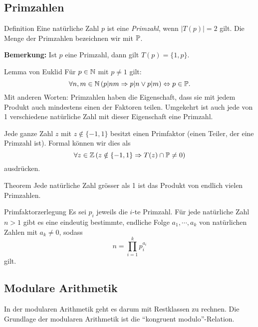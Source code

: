 \subsection{Primzahlen}\label{subsec:primzahlen}

\begin{definition}{Definition}
    Eine natürliche Zahl $p$ ist eine \emph{Primzahl}, wenn $|T(p)| = 2$ gilt.
    Die Menge der Primzahlen bezeichnen wir mit $\P$.
\end{definition}

\textbf{Bemerkung:} Ist $p$ eine Primzahl, dann gilt $T(p) = \{ 1,p \}$.

\begin{definition}{Lemma von Euklid}
    Für $p \in \N$ mit $p \neq 1$ gilt: \[\forall n,m \in \N \left( p|nm \Rightarrow p|n \lor p|m \right) \Leftrightarrow p \in \P.\]
    Mit anderen Worten: Primzahlen haben die Eigenschaft, dass sie mit jedem Produkt auch mindestens einen der Faktoren teilen.
    Umgekehrt ist auch jede von 1 verschiedene natürliche Zahl mit dieser Eigenschaft eine Primzahl.
\end{definition}

\begin{definition}{}
    Jede ganze Zahl $z$ mit $z \notin \{ -1,1 \}$ besitzt einen Primfaktor (einen Teiler, der eine Primzahl ist).
    Formal können wir dies als \[\forall z \in \Z \left( z \notin \{-1,1 \} \Rightarrow T(z) \cap \P \neq 0 \right)\] ausdrücken.
\end{definition}

\begin{definition}{Theorem}
    Jede natürliche Zahl grösser als 1 ist das Produkt von endlich vielen Primzahlen.
\end{definition}

\begin{definition}{Primfaktorzerlegung}
    Es sei $p_i$ jeweils die $i$-te Primzahl.
    Für jede natürliche Zahl $n > 1$ gibt es eine eindeutig bestimmte, endliche Folge $a_1,\cdots,a_k$ von natürlichen Zahlen mit $a_k \neq 0$, sodass \[n = \prod_{i=1}^k p_i^{a_i}\] gilt.
\end{definition}

\subsection{Modulare Arithmetik}\label{subsec:modulare-arithmetik}

In der modularen Arithmetik geht es darum mit Restklassen zu rechnen.
Die Grundlage der modularen Arithmetik ist die ``kongruent modulo''-Relation.

